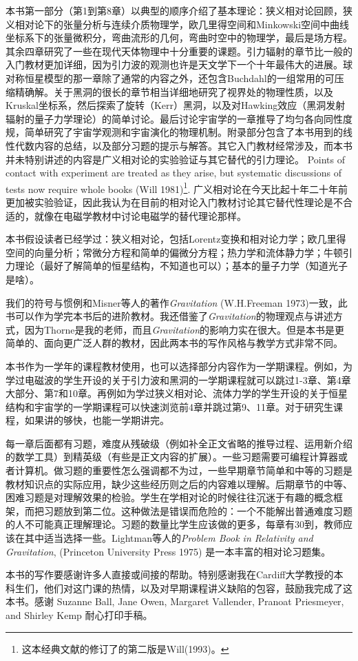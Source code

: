 本书第一部分（第1到第8章）以典型的顺序介绍了基本理论：狭义相对论回顾，狭义相对论下的张量分析与连续介质物理学，欧几里得空间和Minkowski空间中曲线坐标系下的张量微积分，弯曲流形的几何，弯曲时空中的物理学，最后是场方程。其余四章研究了一些在现代天体物理中十分重要的课题。引力辐射的章节比一般的入门教材更加详细，因为引力波的观测也许是天文学下一个十年最伟大的进展。球对称恒星模型的那一章除了通常的内容之外，还包含Buchdahl的一组常用的可压缩精确解。关于黑洞的很长的章节相当详细地研究了视界处的物理性质，以及Kruskal坐标系，然后探索了旋转（Kerr）黑洞，以及对Hawking效应（黑洞发射辐射的量子力学理论）的简单讨论。最后讨论宇宙学的一章推导了均匀各向同性度规，简单研究了宇宙学观测和宇宙演化的物理机制。附录部分包含了本书用到的线性代数内容的总结，以及部分习题的提示与解答。其它入门教材经常涉及，而本书并未特别讲述的内容是广义相对论的实验验证与其它替代的引力理论。 Points of contact with experiment are treated as they arise, but systematic discussions of tests now require whole books (Will 1981)\footnote{这本经典文献的修订了的第二版是Will(1993)。}. 广义相对论在今天比起十年二十年前更加被实验验证，因此我认为在目前的相对论入门教材讨论其它替代性理论是不合适的，就像在电磁学教材中讨论电磁学的替代理论那样。

本书假设读者已经学过：狭义相对论，包括Lorentz变换和相对论力学；欧几里得空间的向量分析；常微分方程和简单的偏微分方程；热力学和流体静力学；牛顿引力理论（最好了解简单的恒星结构，不知道也可以）；基本的量子力学（知道光子是啥）。

我们的符号与惯例和Misner等人的著作\textit{Gravitation} (W.H.Freeman 1973)一致，此书可以作为学完本书后的进阶教材。我还借鉴了\textit{Gravitation}的物理观点与讲述方式，因为Thorne是我的老师，而且\textit{Gravitation}的影响力实在很大。但是本书是更简单的、面向更广泛人群的教材，因此两本书的写作风格与教学方式非常不同。

本书作为一学年的课程教材使用，也可以选择部分内容作为一学期课程。例如，为学过电磁波的学生开设的关于引力波和黑洞的一学期课程就可以跳过1-3章、第4章大部分、第7和10章。再例如为学过狭义相对论、流体力学的学生开设的关于恒星结构和宇宙学的一学期课程可以快速浏览前4章并跳过第9、11章。对于研究生课程，如果讲的够快，也能一学期讲完。

每一章后面都有习题，难度从残破级（例如补全正文省略的推导过程、运用新介绍的数学工具）到精英级（有些是正文内容的扩展）。一些习题需要可编程计算器或者计算机。做习题的重要性怎么强调都不为过，一些早期章节简单和中等的习题是教材知识点的实际应用，缺少这些经历则之后的内容难以理解。后期章节的中等、困难习题是对理解效果的检验。学生在学相对论的时候往往沉迷于有趣的概念框架，而把习题放到第二位。这种做法是错误而危险的：一个不能解出普通难度习题的人不可能真正理解理论。习题的数量比学生应该做的更多，每章有30到，教师应该在其中适当选择一些。Lightman等人的\textit{Problem Book in Relativity and Gravitation}, (Princeton University Press 1975) 是一本丰富的相对论习题集。

本书的写作要感谢许多人直接或间接的帮助。特别感谢我在Cardiff大学教授的本科生们，他们对这门课的热情，以及对早期课程讲义缺陷的包容，鼓励我完成了这本书。感谢 Suzanne Ball, Jane Owen, Margaret Vallender, Pranoat Priesmeyer, and Shirley Kemp 耐心打印手稿。